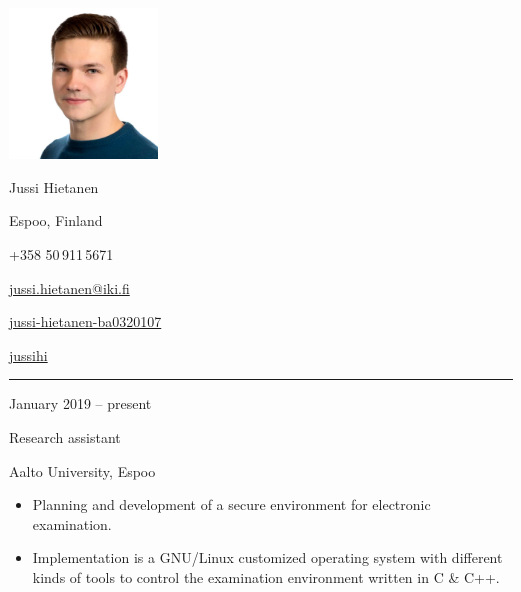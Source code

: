 \documentclass[a4paper,hidelinks,10pt]{article}
\newlength{\cvcolumngapwidth}
\newlength{\cvleftcolumnwidth}
\newlength{\cvrightcolumnwidth}
\newcommand{\cvnamestyle}[1]{{\Large\cvnamefont\textcolor{cvnamecolor}{#1}}}
\newcommand{\cvsectionstyle}[1]{{\normalsize\cvsectionfont\textcolor{cvsectioncolor}{#1}}}
\newcommand{\cvtitlestyle}[1]{{\large\cvtitlefont\textcolor{cvtitlecolor}{#1}}}
\newcommand{\cvdurationstyle}[1]{{\small\cvdurationfont\textcolor{cvdurationcolor}{#1}}}
\newlength{\cvafteritemskipamount}
\newlength{\cvaftersectionskipamount}
\newlength{\cvafternameskipamount}
\newlength{\cvafterpersonalinfolineskipamount}
\newlength{\cvaftertitleskipamount}
\newlength{\cvparskip}
\newcommand{\cvpersonalinfo}[2]{
    \begin{minipage}[t]{\cvleftcolumnwidth}
        \vspace{0mm} %
        \raggedleft #1
    \end{minipage}%
    \hspace{\cvcolumngapwidth}%
    \begin{minipage}[t]{\cvrightcolumnwidth}
        \vspace{0mm} %
        #2
    \end{minipage}

    \vspace{\cvafteritemskipamount}
}
\newcommand{\cvname}[1]{
    \cvnamestyle{#1}

    \vspace{\cvafternameskipamount}
}
\newcommand{\cvpersonalinfolinewithicon}[3]{
    \raisebox{.5\fontcharht\font`E-.5\height}{\texttt{[image: \#2]}}
    #3

    \vspace{\cvafterpersonalinfolineskipamount}
}
\newcommand{\cvsection}[1]{
    \begin{minipage}[t]{\cvleftcolumnwidth}
        \raggedleft\cvsectionstyle{#1}
    \end{minipage}%
    \hspace{\cvcolumngapwidth}%
    \begin{minipage}[t]{\cvrightcolumnwidth}
        \textcolor{cvrulecolor}{\rule{\cvrightcolumnwidth}{0.3mm}}
    \end{minipage}

    \vspace{\cvaftersectionskipamount}
}
\newcommand{\cvitem}[2]{
    \begin{minipage}[t]{\cvleftcolumnwidth}
        \raggedleft #1
    \end{minipage}%
    \hspace{\cvcolumngapwidth}%
    \begin{minipage}[t]{\cvrightcolumnwidth}
        \setlength{\parskip}{\cvparskip} #2
    \end{minipage}

    \vspace{\cvafteritemskipamount}
}
\newcommand{\cvtitle}[1]{
    \cvtitlestyle{#1}

    \vspace{\cvaftertitleskipamount}
    \vspace{-\cvparskip}
}
\begin{document}

\cvpersonalinfo{
    \includegraphics[height=40mm,trim={0cm 0 0cm 0},clip]{cvpic.jpg}}
    {
    \cvname{Jussi Hietanen}

    \cvpersonalinfolinewithicon{height=4mm}{072-location.pdf}{
        Espoo, Finland
    }

    \cvpersonalinfolinewithicon{height=4mm}{067-phone.pdf}{
        +358 50\,911\,5671
    }

    \cvpersonalinfolinewithicon{height=4mm}{070-envelop.pdf}{
        \href{mailto:jussi.hietanen@iki.fi}{jussi.hietanen@iki.fi}
    }

    \cvpersonalinfolinewithicon{height=4mm}{458-linkedin.pdf}{
        \href{https://www.linkedin.com/in/jussi-hietanen-ba0320107/}{jussi-hietanen-ba0320107}
    }
    
    \cvpersonalinfolinewithicon{height=4mm}{GitHub-Mark-120px-plus.png}{
        \href{https://github.com/jussihi}{jussihi}
    }

}

\vspace{2em}



\cvsection{LATEST WORK EXPERIENCE}


\cvitem{
    \cvdurationstyle{January  2019 -- present}
}{
    \cvtitle{Research assistant}

    Aalto University, Espoo

    \begin{itemize}[leftmargin=*]
        \item Planning and development of a secure environment for electronic examination.
        \item Implementation is a GNU/Linux customized operating system with different kinds of tools to control the examination environment written in C \& C++.
    \end{itemize}
}
\end{document}
